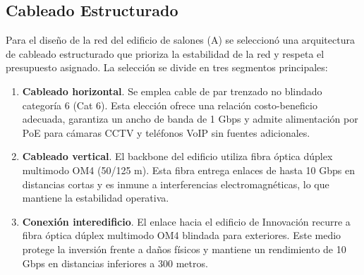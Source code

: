 \subsection{Cableado Estructurado}

Para el diseño de la red del edificio de salones (A) se seleccionó una arquitectura de cableado estructurado que prioriza la estabilidad de la red y respeta el presupuesto asignado. La selección se divide en tres segmentos principales:

\begin{enumerate}
	\item \textbf{Cableado horizontal}. Se emplea cable de par trenzado no blindado categoría 6 (Cat 6). Esta elección ofrece una relación costo-beneficio adecuada, garantiza un ancho de banda de 1 Gbps y admite alimentación por PoE para cámaras CCTV y teléfonos VoIP sin fuentes adicionales.
	\item \textbf{Cableado vertical}. El backbone del edificio utiliza fibra óptica dúplex multimodo OM4 (50/125 \textmu m). Esta fibra entrega enlaces de hasta 10 Gbps en distancias cortas y es inmune a interferencias electromagnéticas, lo que mantiene la estabilidad operativa.
	\item \textbf{Conexión interedificio}. El enlace hacia el edificio de Innovación recurre a fibra óptica dúplex multimodo OM4 blindada para exteriores. Este medio protege la inversión frente a daños físicos y mantiene un rendimiento de 10 Gbps en distancias inferiores a 300 metros.
\end{enumerate}
